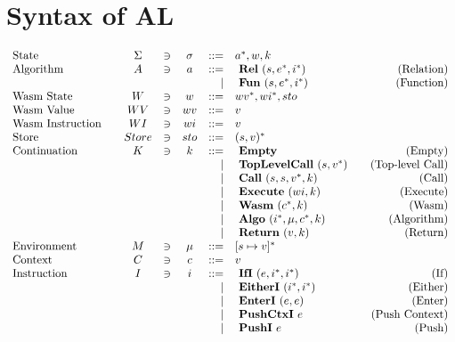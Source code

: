 \section{Syntax of AL}
\label{syntax}

\begin{align*}
\begin{array}{lcccrlr}
%
  \text{State}\quad& \Sigma &\ni& \sigma & ::=& \seq a, w, k \\
%
  \text{Algorithm}\quad& A &\ni& a &::=& ~ \rel ~ (s, \seq e, \seq i) &\quad\text{(Relation)} \\
  &&&& | & ~ \fun ~ (s, \seq e, \seq i) &\quad\text{(Function)} \\
%
  \text{Wasm State}\quad& W &\ni& w &::=& \seq{wv}, \seq{wi}, sto \\
  \text{Wasm Value}\quad& WV &\ni& wv &::=& v \\
  \text{Wasm Instruction}\quad& WI &\ni& wi &::=& v \\
%
  \text{Store}\quad& Store &\ni& sto &::=& \seq{(s, v)} \\
%
  \text{Continuation}\quad & K &\ni& k &::=& ~ \mt &\quad\text{(Empty)} \\
    &&&& | & ~ \toplevelcall ~ (s, \seq v) &\quad\text{(Top-level Call)} \\
    &&&& | & ~ \call ~ (s, s, \seq v, k) &\quad\text{(Call)} \\
    &&&& | & ~ \exe ~ (wi, k) &\quad\text{(Execute)} \\
    &&&& | & ~ \wasm ~ (\seq c, k) &\quad\text{(Wasm)} \\
    &&&& | & ~ \algo ~ (\seq i, \mu, \seq c, k) &\quad\text{(Algorithm)} \\
    &&&& | & ~ \ret ~ (v, k) &\quad\text{(Return)} \\
%
  \text{Environment}\quad& M &\ni& \mu &::=& \seq{[s \mapsto v]} \\
%
  \text{Context}\quad& C &\ni& c &::=& v \\
%
  \text{Instruction}\quad& I &\ni& i &::=& ~ \ifi ~ (e, \seq i, \seq i) &\quad\text{(If)} \\
    &&&& | & ~ \eitheri ~ (\seq i, \seq i) &\quad\text{(Either)} \\
    &&&& | & ~ \enteri ~ (e, e) &\quad\text{(Enter)} \\
    &&&& | & ~ \pushctxi ~ e &\quad\text{(Push Context)} \\
    &&&& | & ~ \pushi ~ e &\quad\text{(Push)} \\

\end{array}
\end{align*}
